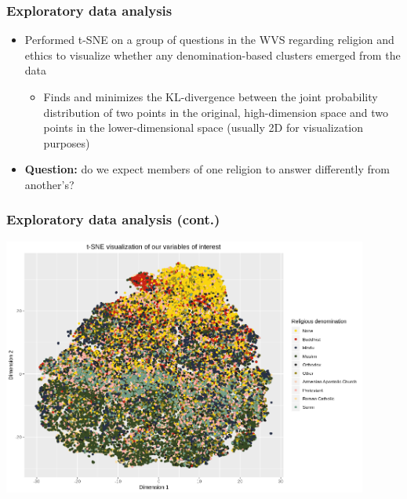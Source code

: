 \documentclass{beamer}
\begin{document}

\begin{frame}
	\frametitle{Exploratory data analysis}
	\begin{itemize}
		\item Performed t-SNE on a group of questions in the WVS regarding religion and ethics to visualize whether any denomination-based clusters emerged from the data
		\begin{itemize}
			\item Finds and minimizes the KL-divergence between the joint probability distribution of two points in the original, high-dimension space and two points in the lower-dimensional space (usually 2D for visualization purposes)
		\end{itemize}
		\item \textbf{Question:} do we expect members of one religion to answer differently from another's?
	\end{itemize}
\end{frame}


\begin{frame}
	\frametitle{Exploratory data analysis (cont.)}
	\begin{center}
		\includegraphics[width=0.9\textwidth]{tsne.png}
	\end{center}
\end{frame}

\end{document}
